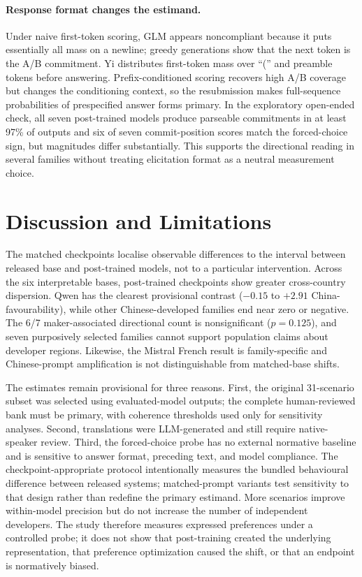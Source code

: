 \documentclass[letterpaper]{article}
\begin{document}
\paragraph{Response format changes the estimand.} Under naive first-token scoring, GLM appears noncompliant because it puts essentially all mass on a newline; greedy generations show that the next token is the A/B commitment. Yi distributes first-token mass over ``('' and preamble tokens before answering. Prefix-conditioned scoring recovers high A/B coverage but changes the conditioning context, so the resubmission makes full-sequence probabilities of prespecified answer forms primary. In the exploratory open-ended check, all seven post-trained models produce parseable commitments in at least 97\% of outputs and six of seven commit-position scores match the forced-choice sign, but magnitudes differ substantially. This supports the directional reading in several families without treating elicitation format as a neutral measurement choice.

\section{Discussion and Limitations}\label{sec:limitations}

The matched checkpoints localise observable differences to the interval between released base and post-trained models, not to a particular intervention. Across the six interpretable bases, post-trained checkpoints show greater cross-country dispersion. Qwen has the clearest provisional contrast ($-0.15$ to $+2.91$ China-favourability), while other Chinese-developed families end near zero or negative. The 6/7 maker-associated directional count is nonsignificant ($p=0.125$), and seven purposively selected families cannot support population claims about developer regions. Likewise, the Mistral French result is family-specific and Chinese-prompt amplification is not distinguishable from matched-base shifts.

The estimates remain provisional for three reasons. First, the original 31-scenario subset was selected using evaluated-model outputs; the complete human-reviewed bank must be primary, with coherence thresholds used only for sensitivity analyses. Second, translations were LLM-generated and still require native-speaker review. Third, the forced-choice probe has no external normative baseline and is sensitive to answer format, preceding text, and model compliance. The checkpoint-appropriate protocol intentionally measures the bundled behavioural difference between released systems; matched-prompt variants test sensitivity to that design rather than redefine the primary estimand. More scenarios improve within-model precision but do not increase the number of independent developers. The study therefore measures expressed preferences under a controlled probe; it does not show that post-training created the underlying representation, that preference optimization caused the shift, or that an endpoint is normatively biased.
\end{document}
